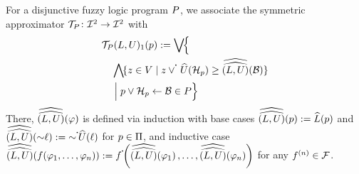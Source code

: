 \begin{definition}
    \label{def:approximator}
    For a disjunctive fuzzy logic program $\flp$, we associate the symmetric approximator \mbox{$\lpap\colon\bil[\Fint]\to\bil[\Fint]$} with
    \begin{align*}
&\fst{\lpap(\lint, \uint)}(\atom) \eqdef \biglub \Bigl\{\\
&\quad \bigglb\{z\in\lset \mid z\flpcontf{\flpor}\fformeval{\uint}{\headminus}\geq\fnformeval{\lint}{\uint}{\body}\}\\
&\quad \Bigm| \atom \flpor \headminus\flpif{}\body \in \flp\Bigr\}
\end{align*}
    \noindent There, $\fnformeval{\lint}{\uint}{\varphi}$ is defined via induction with base cases
    $\fnformeval{\lint}{\uint}{\atom}\eqdef\fformeval{\lint}{\atom}$ and
    $\fnformeval{\lint}{\uint}{\flpnot\literal}\eqdef\flpnotf\fformeval{\uint}{\literal}$ for $\atom\in\Atoms$, and inductive case
    $\fnformeval{\lint}{\uint}{f(\varphi_1,\ldots,\varphi_n)}\eqdef\flpcontf{f}\!\!\left(\fnformeval{\lint}{\uint}{\varphi_1},\ldots,\fnformeval{\lint}{\uint}{\varphi_n}\right)$ for any $f^{(n)}\in\Flpcon$.
\end{definition}

